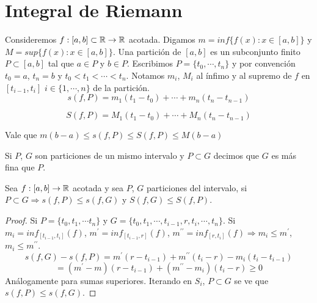 \section{Integral de Riemann}

Consideremos $f: [a, b] \subset \mathbb{R} \to \mathbb{R}$ acotada. Digamos $m = inf\{ f(x) : x \in [a,b] \}$ y $M = sup \{ f(x) : x \in [a, b] \}$. 
Una partición de $[a, b]$ es un subconjunto finito $P \subset [a, b]$ tal que $a \in P$ y $b \in P$.
Escribimos $P = \{ t_0, \cdots, t_n \}$ y por convención $t_0 = a$, $t_n = b$ y $t_0 < t_1 < \cdots < t_n$.
Notamos $m_i$, $M_i$ al ínfimo y al supremo de $f$ en $[t_{i-1}, t_i]$ $i \in \{ 1, \cdots, n \}$ de la partición.
\begin{equation}
  s(f, P) = m_1 (t_1 - t_0) + \cdots + m_n (t_n - t_{n-1})
\end{equation}

\begin{equation}
  S(f, P) = M_1 (t_1 - t_0) + \cdots + M_n (t_n - t_{n-1})
\end{equation}

Vale que $m (b-a) \leq s(f, P) \leq S(f, P) \leq M (b-a)$

\begin{definition}
  Si $P$, $G$ son particiones de un mismo intervalo y $P \subset G$ decimos que $G$ es más fina que $P$.
\end{definition}

\begin{lemma}
  Sea $f: [a, b] \to \mathbb{R}$ acotada y sea $P$, $G$ particiones del intervalo, si $P \subset G \Rightarrow s(f, P) \leq s(f, G)$ y $S(f, G) \leq S(f, P)$.
  \begin{proof}
    Si $P = \{ t_0, t_1, \cdots t_n \}$ y $G = \{ t_0, t_1, \cdots, t_{i-1}, r, t_i, \cdots, t_n \}$. Si $m_i = inf_{[t_{i-1}, t_i]}(f)$, $m^{\prime} = inf_{[t_{i-1}, r]}(f)$, $m^{\prime \prime} = inf_{[r, t_i]}(f) \Rightarrow m_i \leq m^{\prime}$, $m_i \leq m^{\prime \prime}$. \begin{equation}
      s(f, G) - s(f, P) = m^{\prime} (r - t_{i-1}) + m^{\prime \prime} (t_i - r) - m_i (t_i - t_{i-1})
    \end{equation}
    \begin{equation}
      = (m^{\prime} - m)(r - t_{i-1}) + (m^{\prime \prime} - m_i) (t_i - r) \geq 0
    \end{equation}
    Análogamente para sumas superiores. Iterando en $S_i$, $P \subset G$ se ve que $s(f, P) \leq s(f, G)$.
  \end{proof}
\end{lemma}

